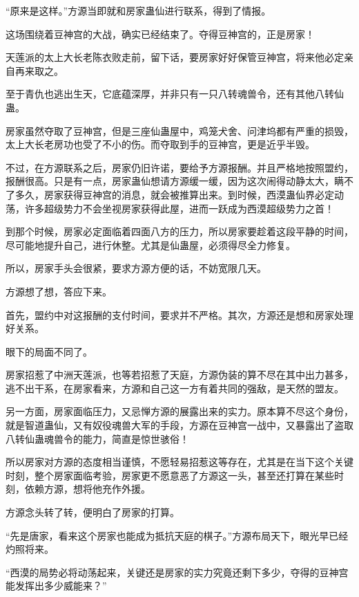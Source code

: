 
\begin{this_body}



“原来是这样。”方源当即就和房家蛊仙进行联系，得到了情报。

这场围绕着豆神宫的大战，确实已经结束了。夺得豆神宫的，正是房家！

天莲派的太上大长老陈衣败走前，留下话，要房家好好保管豆神宫，将来他必定亲自再来取之。

至于青仇也逃出生天，它底蕴深厚，并非只有一只八转魂兽令，还有其他八转仙蛊。

房家虽然夺取了豆神宫，但是三座仙蛊屋中，鸡笼犬舍、问津坞都有严重的损毁，太上大长老房功也受了不小的伤。而夺取到手的豆神宫，更是近乎半毁。

不过，在方源联系之后，房家仍旧许诺，要给予方源报酬。并且严格地按照盟约，报酬很高。只是有一点，房家蛊仙想请方源缓一缓，因为这次闹得动静太大，瞒不了多久，房家获得豆神宫的消息，就会被推算出来。到时候，西漠蛊仙界必定动荡，许多超级势力不会坐视房家获得此屋，进而一跃成为西漠超级势力之首！

到那个时候，房家必定面临着四面八方的压力，所以房家要趁着这段平静的时间，尽可能地提升自己，进行休整。尤其是仙蛊屋，必须得尽全力修复。

所以，房家手头会很紧，要求方源方便的话，不妨宽限几天。

方源想了想，答应下来。

首先，盟约中对这报酬的支付时间，要求并不严格。其次，方源还是想和房家处理好关系。

眼下的局面不同了。

房家招惹了中洲天莲派，也等若招惹了天庭，方源伪装的算不尽在其中出力甚多，逃不出干系，在房家看来，方源和自己这一方有着共同的强敌，是天然的盟友。

另一方面，房家面临压力，又忌惮方源的展露出来的实力。原本算不尽这个身份，就是智道蛊仙，又有奴役魂兽大军的手段，方源在豆神宫一战中，又暴露出了盗取八转仙蛊魂兽令的能力，简直是惊世骇俗！

所以房家对方源的态度相当谨慎，不愿轻易招惹这等存在，尤其是在当下这个关键时刻，整个房家面临考验，房家更不愿意恶了方源这一头，甚至还打算在某些时刻，依赖方源，想将他充作外援。

方源念头转了转，便明白了房家的打算。

“先是唐家，看来这个房家也能成为抵抗天庭的棋子。”方源布局天下，眼光早已经灼照将来。

“西漠的局势必将动荡起来，关键还是房家的实力究竟还剩下多少，夺得的豆神宫能发挥出多少威能来？”


\end{this_body}
